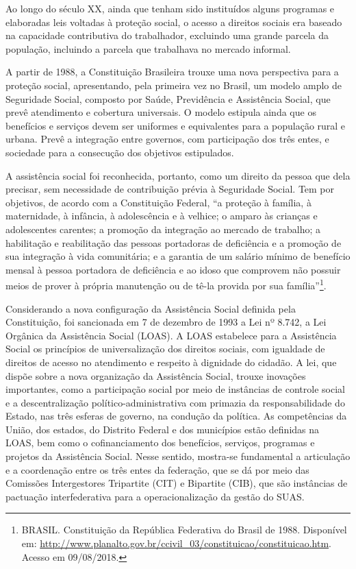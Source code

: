 \documentclass[brazilian]{report}
\begin{document}
Ao longo do século XX, ainda que tenham sido instituídos alguns programas e elaboradas leis voltadas à proteção social, o acesso a direitos sociais era baseado na capacidade contributiva do trabalhador, excluindo uma grande parcela da população, incluindo a parcela que trabalhava no mercado informal.

A partir de 1988, a Constituição Brasileira trouxe uma nova perspectiva para a proteção social, apresentando, pela primeira vez no Brasil, um modelo amplo de Seguridade Social, composto por Saúde, Previdência e Assistência Social, que prevê atendimento e cobertura universais. O modelo estipula ainda que os benefícios e serviços devem ser uniformes e equivalentes para a população rural e urbana. Prevê a integração entre governos, com participação dos três entes, e sociedade para a consecução dos objetivos estipulados.

A assistência social foi reconhecida, portanto, como um direito da pessoa que dela precisar, sem necessidade de contribuição prévia à Seguridade Social. Tem por objetivos, de acordo com a Constituição Federal, “a proteção à família, à maternidade, à infância, à adolescência e à velhice; o amparo às crianças e adolescentes carentes; a promoção da integração ao mercado de trabalho; a habilitação e reabilitação das pessoas portadoras de deficiência e a promoção de sua integração à vida comunitária; e a garantia de um salário mínimo de benefício mensal à pessoa portadora de deficiência e ao idoso que comprovem não possuir meios de prover à própria manutenção ou de tê-la provida por sua família”\footnote{BRASIL. Constituição da República Federativa do Brasil de 1988. Disponível em: \url{http://www.planalto.gov.br/ccivil_03/constituicao/constituicao.htm}. Acesso em 09/08/2018.}.

Considerando a nova configuração da Assistência Social definida pela Constituição, foi sancionada em 7 de dezembro de 1993 a Lei nº 8.742, a Lei Orgânica da Assistência Social (LOAS). A LOAS estabelece para a Assistência Social os princípios de universalização dos direitos sociais, com igualdade de direitos de acesso no atendimento e respeito à dignidade do cidadão. A lei, que dispõe sobre a nova organização da Assistência Social, trouxe inovações importantes, como a participação social por meio de instâncias de controle social e a descentralização político-administrativa com primazia da responsabilidade do Estado, nas três esferas de governo, na condução da política. As competências da União, dos estados, do Distrito Federal e dos municípios estão definidas na LOAS, bem como o cofinanciamento dos benefícios, serviços, programas e projetos da Assistência Social. Nesse sentido, mostra-se fundamental a articulação e a coordenação entre os três entes da federação, que se dá por meio das Comissões Intergestores Tripartite (CIT) e Bipartite (CIB), que são instâncias de pactuação interfederativa para a operacionalização da gestão do SUAS.
\end{document}
